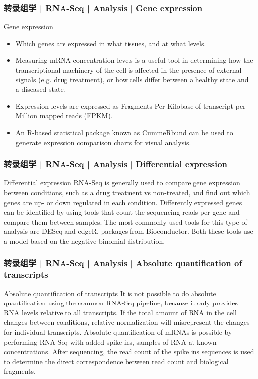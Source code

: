 \begin{frame}
  \frametitle{转录组学 | RNA-Seq | Analysis | Gene expression}
  \begin{block}{Gene expression}
    \begin{itemize}
      \item Which genes are expressed in what tissues, and at what levels.
      \item Measuring mRNA concentration levels is a useful tool in determining how the transcriptional machinery of the cell is affected in the presence of external signals (e.g. drug treatment), or how cells differ between a healthy state and a diseased state.
      \item Expression levels are expressed as Fragments Per Kilobase of transcript per Million mapped reads (FPKM).
      \item An R-based statistical package known as CummeRbund can be used to generate expression comparison charts for visual analysis.
    \end{itemize}
  \end{block}
\end{frame}

\begin{frame}
  \frametitle{转录组学 | RNA-Seq | Analysis | Differential expression}
  \begin{block}{Differential expression}
 RNA-Seq is generally used to compare gene expression between conditions, such as a drug treatment vs non-treated, and find out which genes are up- or down regulated in each condition. Differently expressed genes can be identified by using tools that count the sequencing reads per gene and compare them between samples. The most commonly used tools for this type of analysis are DESeq and edgeR, packages from Bioconductor. Both these tools use a model based on the negative binomial distribution.
  \end{block}
\end{frame}

\begin{frame}
  \frametitle{转录组学 | RNA-Seq | Analysis | Absolute quantification of transcripts}
  \begin{block}{Absolute quantification of transcripts}
 It is not possible to do absolute quantification using the common RNA-Seq pipeline, because it only provides RNA levels relative to all transcripts. If the total amount of RNA in the cell changes between conditions, relative normalization will misrepresent the changes for individual transcripts. Absolute quantification of mRNAs is possible by performing RNA-Seq with added spike ins, samples of RNA at known concentrations. After sequencing, the read count of the spike ins sequences is used to determine the direct correspondence between read count and biological fragments.
  \end{block}
\end{frame}

